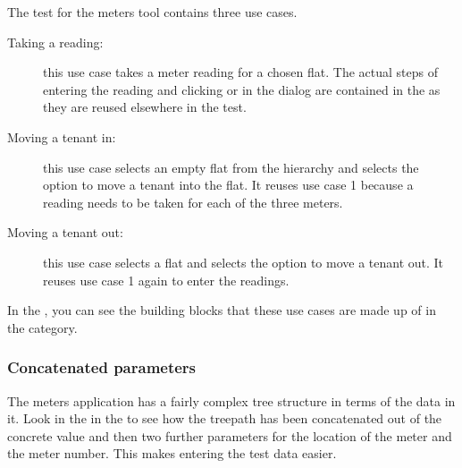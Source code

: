 

The test for the meters tool contains three use cases. 
\begin{description}
\item [Taking a reading:]{ this use case takes a meter reading for a chosen flat. The actual steps of entering the reading and clicking  or  in the dialog are contained in the \gdcase{}  as they are reused elsewhere in the test.}
\item [Moving a tenant in:]{ this use case selects an empty flat from the hierarchy and selects the option to move a tenant into the flat. It reuses use case 1 because a reading needs to be taken for each of the three meters.}
\item [Moving a tenant out:]{ this use case selects a flat and selects the option to move a tenant out. It reuses use case 1 again to enter the readings. } 
\end{description}

In the  \gdproject{}, you can see the building blocks that these use cases are made up of in the  category. 

\subsubsection{Concatenated parameters}
The meters application has a fairly complex tree structure in terms of the data in it. Look in the \gdcase{}  in the  \gdproject{} to see how the treepath has been concatenated out of the concrete value  and then two further parameters for the location of the meter and the meter number. This makes entering the test data easier. 
